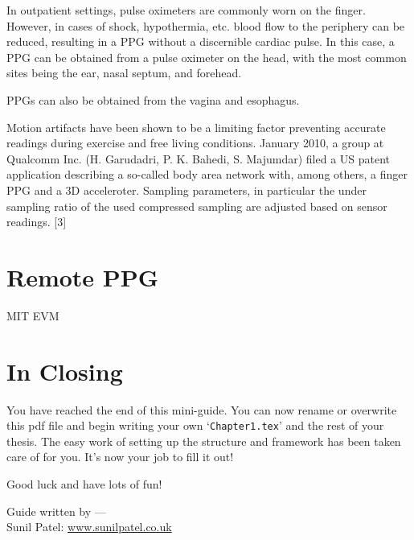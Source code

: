In outpatient settings, pulse oximeters are commonly worn on the finger. 
However, in cases of shock, hypothermia, etc. blood flow to the periphery 
can be reduced, resulting in a PPG without a discernible cardiac pulse. 
In this case, a PPG can be obtained from a pulse oximeter on the head, 
with the most common sites being the ear, nasal septum, and forehead.

PPGs can also be obtained from the vagina and esophagus.

Motion artifacts have been shown to be a limiting factor preventing accurate readings 
during exercise and free living conditions. 
January 2010, a group at Qualcomm Inc. (H. Garudadri, P. K. Bahedi, S. Majumdar) 
filed a US patent application describing a so-called body area network with, 
among others, a finger PPG and a 3D acceleroter. Sampling parameters, 
in particular the under sampling ratio of the used compressed sampling are adjusted based 
on sensor readings. [3]

\section{Remote PPG}

\begin{compactitem}

\item MIT EVM
\end{compactitem}


\section{In Closing}

You have reached the end of this mini-guide. You can now rename or overwrite this pdf file and begin writing your own `\texttt{Chapter1.tex}' and the rest of your thesis. The easy work of setting up the structure and framework has been taken care of for you. It's now your job to fill it out!

Good luck and have lots of fun!

\begin{flushright}
Guide written by ---\\
Sunil Patel: \href{http://www.sunilpatel.co.uk}{www.sunilpatel.co.uk}
\end{flushright}
